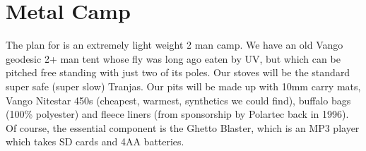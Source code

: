 \section{Metal Camp}


The plan for  is an extremely light weight 2 man camp. We have an old Vango geodesic 2+ man tent whose fly was long ago eaten by UV, but which can be pitched free standing with just two of its poles. Our stoves will be the standard super safe (super slow) Tranjas. Our pits will be made up with 10mm carry mats, Vango Nitestar 450s (cheapest, warmest, synthetics we could find), buffalo bags (100\% polyester) and fleece liners (from sponsorship by Polartec back in 1996). Of course, the essential component is the Ghetto Blaster, which is an MP3 player which takes SD cards and 4AA batteries.






